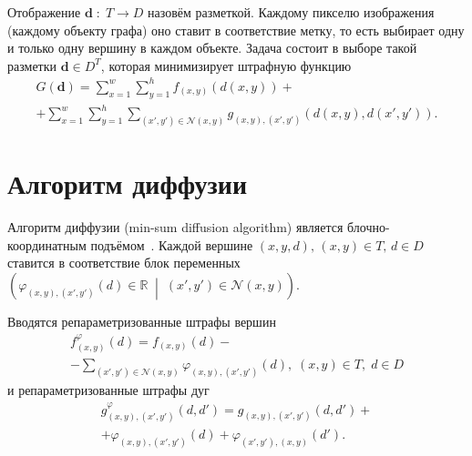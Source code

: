 \documentclass{ConfFTI}
\begin{document}
Отображение $\pmb{d} \; : \; T \to D$ назовём разметкой.
Каждому пикселю изображения (каждому объекту графа) оно
ставит в соответствие метку,
то есть выбирает одну и только одну вершину в каждом объекте.
Задача состоит в выборе такой разметки $\pmb{d} \in D^T$,
которая минимизирует штрафную функцию
\begin{equation}\label{eq:penalty}
\begin{gathered}
    G \left( \pmb{d} \right) =
    \sum \limits_{x = 1}^w
        \sum \limits_{y = 1}^h
            f_{\left(x, y \right)} \left(d \left(x, y \right) \right) + \\
    + \sum \limits_{x = 1}^w
        \sum \limits_{y = 1}^h
            \sum \limits_{\left(x', y' \right) \in \mathcal{N}\left(x, y \right)}
                g_{\left(x, y \right), \left(x', y'\right)} \left(
                    d \left(x, y \right), d\left(x', y' \right)
                \right).
\end{gathered}
\end{equation}

\section{Алгоритм диффузии}

Алгоритм диффузии (min-sum diffusion algorithm)
является блочно-координатным подъёмом~\cite{savchynskyy}.
Каждой вершине $\left(x, y, d \right), \, \left(x, y \right) \in T, \, d \in D$
ставится в соответствие блок переменных
$\left(
    \varphi_{ \left(x, y \right), \left(x', y'\right)} \left(d \right)
        \in \mathbb{R} \; \middle| \;
    \left(x', y' \right) \in \mathcal{N}\left(x, y \right)
\right)$.

Вводятся репараметризованные штрафы вершин
\begin{equation*}
\begin{gathered}
    f_{\left(x, y \right)}^{\varphi} \left(d\right) =
    f_{\left(x, y \right)} \left(d \right) - \\
    - \sum \limits_{\left(x', y'\right) \in \mathcal{N}\left(x, y \right)}
        \varphi_{\left(x, y \right), \left(x', y'\right)}\left(d \right), \;
    \left(x, y \right) \in T, \;
    d \in D
\end{gathered}
\end{equation*}
и репараметризованные штрафы дуг
\begin{equation*}
\begin{gathered}
    g_{\left(x, y \right), \left(x', y'\right)}^{\varphi} \left(d, d' \right) =
    g_{\left(x, y \right), \left(x', y'\right)} \left(d, d' \right) + \\
    + \varphi_{\left(x, y \right), \left(x', y' \right)} \left(d\right) +
    \varphi_{\left(x', y' \right), \left(x, y \right)} \left(d'\right).
\end{gathered}
\end{equation*}
\end{document}
